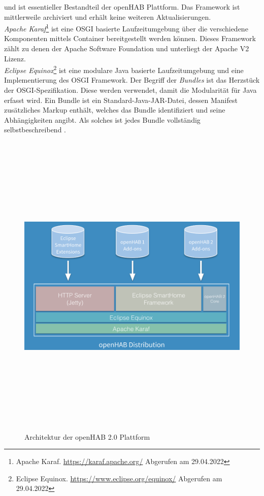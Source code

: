     und ist essentieller Bestandteil der openHAB Plattform. Das Framework ist mittlerweile archiviert und erhält keine weiteren 
    Aktualisierungen.
    \\
    \linebreak
    \textit{Apache Karaf}\footnote{Apache Karaf. \url{https://karaf.apache.org/} Abgerufen am 29.04.2022} 
    ist eine \acs{OSGI} basierte Laufzeitumgebung über die verschiedene Komponenten mittels Container 
    bereitgestellt werden können. Dieses Framework zählt zu denen der Apache Software Foundation und unterliegt der Apache V2 Lizenz.
    \\
    \linebreak
    \textit{Eclipse Equinox}\footnote{Eclipse Equinox. \url{https://www.eclipse.org/equinox/} Abgerufen am 29.04.2022} ist eine modulare 
    Java basierte Laufzeitumgebung und eine Implementierung des \acs{OSGI} Framework. Der Begriff der \textit{Bundles} ist das 
    Herzstück der \acs{OSGI}-Spezifikation. Diese werden verwendet, damit die Modularität für Java erfasst wird. Ein Bundle ist 
    ein Standard-Java-JAR-Datei, dessen Manifest zusätzliches Markup enthält, welches das Bundle identifiziert und seine Abhängigkeiten 
    angibt. Als solches ist jedes Bundle vollständig selbstbeschreibend \cite{openHAB-article}. 
    \begin{figure}[hbt!]
        \centering
        \includegraphics[width=15cm,height=15cm,keepaspectratio]{images/openhab-2-architecture.png}
        \caption{Architektur der openHAB 2.0 Plattform \cite{kaikreutzer2016}}
        \label{fig:architectureopenHAB2}
    \end{figure}
